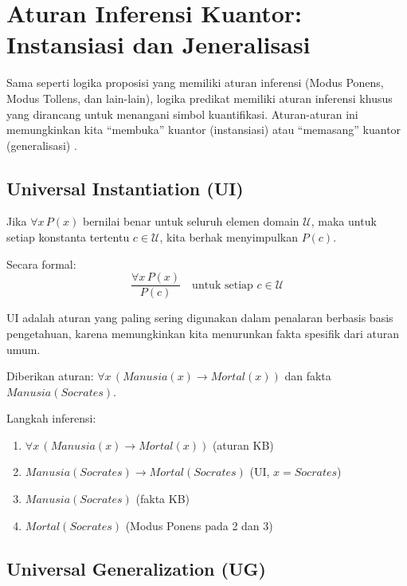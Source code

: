 \section{Aturan Inferensi Kuantor: Instansiasi dan Jeneralisasi}

Sama seperti logika proposisi yang memiliki aturan inferensi (Modus Ponens, Modus Tollens, dan lain-lain), logika predikat memiliki aturan inferensi khusus yang dirancang untuk menangani simbol kuantifikasi. Aturan-aturan ini memungkinkan kita ``membuka'' kuantor (instansiasi) atau ``memasang'' kuantor (generalisasi) \cite{rosen2019}.

\subsection{Universal Instantiation (UI)}

\begin{definisi}
Jika $\forall x\, P(x)$ bernilai benar untuk seluruh elemen domain $\mathcal{U}$, maka untuk setiap konstanta tertentu $c \in \mathcal{U}$, kita berhak menyimpulkan $P(c)$.

Secara formal:
\[ \frac{\forall x\, P(x)}{P(c)} \quad \text{untuk setiap } c \in \mathcal{U} \]
\end{definisi}

UI adalah aturan yang paling sering digunakan dalam penalaran berbasis basis pengetahuan, karena memungkinkan kita menurunkan fakta spesifik dari aturan umum.

\begin{contoh}
Diberikan aturan: $\forall x\, (Manusia(x) \rightarrow Mortal(x))$ dan fakta $Manusia(Socrates)$.

Langkah inferensi:
\begin{enumerate}
    \item $\forall x\, (Manusia(x) \rightarrow Mortal(x))$ \hfill (aturan KB)
    \item $Manusia(Socrates) \rightarrow Mortal(Socrates)$ \hfill (UI, $x = Socrates$)
    \item $Manusia(Socrates)$ \hfill (fakta KB)
    \item $Mortal(Socrates)$ \hfill (Modus Ponens pada 2 dan 3)
\end{enumerate}
\end{contoh}

\subsection{Universal Generalization (UG)}

